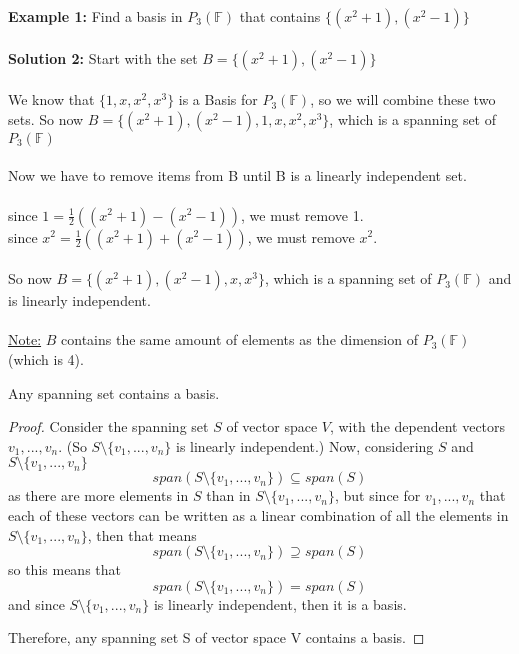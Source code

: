 \documentclass[12pt]{article}
\begin{document}
\textbf{Example 1:} Find a basis in $P_3 (\mathbb{F})$ that contains $\{ (x^2 + 1),(x^2 - 1) \}$
\\
\\
\textbf{Solution 2:} Start with the set $B = \{ (x^2 + 1),(x^2 - 1) \}$\\
\\
We know that $\{1,x,x^2,x^3\}$ is a Basis for $P_3 (\mathbb{F})$, so we will combine these two sets. So now $B = \{ (x^2 + 1),(x^2 - 1),1,x,x^2,x^3 \}$, which is a spanning set of $P_3 (\mathbb{F})$\\
\\
Now we have to remove items from B until B is a linearly independent set.\\
\\
since $1 = \frac{1}{2}((x^2 + 1) - (x^2 - 1))$, we must remove 1.\\
since $x^2 =  \frac{1}{2}((x^2 + 1) + (x^2 - 1))$, we must remove $x^2$.\\
\\
So now $B = \{ (x^2 + 1),(x^2 - 1),x,x^3 \}$, which is a spanning set of $P_3 (\mathbb{F})$ and is linearly independent.\\
\\
\underline{Note:} $B$ contains the same amount of elements as the dimension of $P_3 (\mathbb{F})$ (which is 4).\\

\begin{tcolorbox}
	Any spanning set contains a basis.
\end{tcolorbox}

\begin{proof}
	Consider the spanning set $S$ of vector space $V$, with the dependent vectors $v_1,...,v_n$. (So $S \setminus \{v_1,...,v_n\}$ is linearly independent.)
	Now, considering $S$ and $S \setminus \{v_1,...,v_n\}$\\
	$$span(S \setminus \{v_1,...,v_n\}) \subseteq span(S)$$ as there are more elements in $S$ 	than in $S \setminus \{v_1,...,v_n\}$, but since for $v_1,...,v_n$ that each of these 	vectors can be written as a linear combination of all the elements in $S \setminus \{v_1,...,v_n\}$, then that means
	$$span(S \setminus \{v_1,...,v_n\}) \supseteq span(S)$$
	so this means that
	$$span(S \setminus \{v_1,...,v_n\}) = span(S)$$
	and since $S \setminus \{v_1,...,v_n\}$ is linearly independent, then it is a basis.
	
	Therefore, any spanning set S of vector space V contains a basis.
\end{proof}
\end{document}
